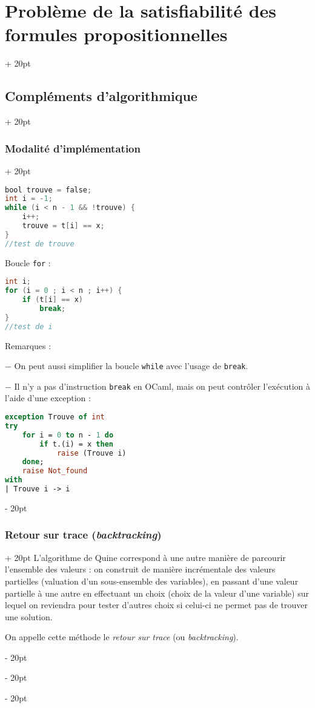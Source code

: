 \documentclass[a4paper, 12pt, twoside]{article}
\newcommand{\ind}[1][20pt]{\advance\leftskip + #1}
\newcommand{\deind}[1][20pt]{\advance\leftskip - #1}
\newenvironment{indt}[2][20pt]{#2 \par \ind[#1]}{\par \deind} %
\begin{document}
\begin{indt}{\section{Problème de la satisfiabilité des formules propositionnelles}}
\begin{indt}{\subsection{Compléments d'algorithmique}}
\begin{indt}{\subsubsection{Modalité d'implémentation}}
                \begin{lstlisting}[language=C, xleftmargin=80pt]
bool trouve = false;
int i = -1;
while (i < n - 1 && !trouve) {
    i++;
    trouve = t[i] == x;
}
//test de trouve\end{lstlisting}
                
                Boucle \texttt{for} :
                
                \begin{lstlisting}[language=C, xleftmargin=80pt]
int i;
for (i = 0 ; i < n ; i++) {
    if (t[i] == x)
        break;
}
//test de i\end{lstlisting}
                
                Remarques :
                
                $-$ On peut aussi simplifier la boucle \texttt{while} avec l'usage de \texttt{break}.
                
                $-$ Il n'y a pas d'instruction \texttt{break} en OCaml, mais on peut contrôler l'exécution à l'aide d'une exception :
                
                \begin{lstlisting}[language=Caml, xleftmargin=80pt]
exception Trouve of int
try
    for i = 0 to n - 1 do
        if t.(i) = x then
            raise (Trouve i)
    done;
    raise Not_found
with
| Trouve i -> i\end{lstlisting}
            \end{indt}
            
            \vspace{12pt}
            
            \begin{indt}{\subsubsection{Retour sur trace (\textit{backtracking})}}
                L'algorithme de Quine correspond à une autre manière de parcourir l'ensemble des valeurs : on construit de manière incrémentale des valeurs partielles (valuation d'un sous-ensemble des variables), en passant d'une valeur partielle à une autre en effectuant un choix (choix de la valeur d'une variable) sur lequel on reviendra pour tester d'autres choix si celui-ci ne permet pas de trouver une solution.
                
                On appelle cette méthode le \textit{retour sur trace} (ou \textit{backtracking}).
                

\end{indt}
\end{indt}
\end{indt}
\end{document}

